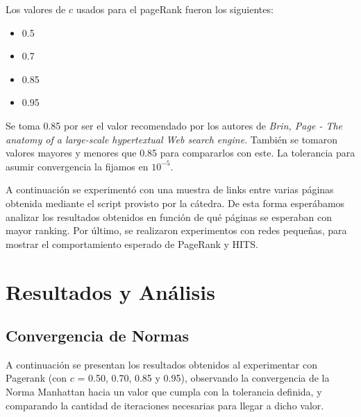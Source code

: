 \documentclass[a4paper]{article}
\begin{document}
Los valores de $c$ usados para el pageRank fueron los siguientes:
\begin{itemize}
\item 0.5
\item 0.7
\item 0.85
\item 0.95
\end{itemize}
Se toma 0.85 por ser el valor recomendado por los autores de \textit{Brin, Page - The anatomy of a large-scale hypertextual Web search engine}. También se tomaron valores mayores y menores que 0.85 para compararlos con este.
La tolerancia para asumir convergencia la fijamos en $10^{-5}$.

A continuación se experimentó con una muestra de links entre varias páginas obtenida mediante el script provisto por la cátedra. De esta forma esperábamos analizar los resultados obtenidos en función de qué páginas se esperaban con mayor ranking. Por último, se realizaron experimentos con redes pequeñas, para mostrar el comportamiento esperado de PageRank y HITS.

\newpage
\section{Resultados y Análisis}
\label{sec:res}

\subsection{Convergencia de Normas}


A continuación se presentan los resultados obtenidos al experimentar con Pagerank (con $c$ = 0.50, 0.70, 0.85 y 0.95), observando la convergencia de la Norma Manhattan hacia un valor que cumpla con la tolerancia definida, y comparando la cantidad de iteraciones necesarias para llegar a dicho valor.
\end{document}
